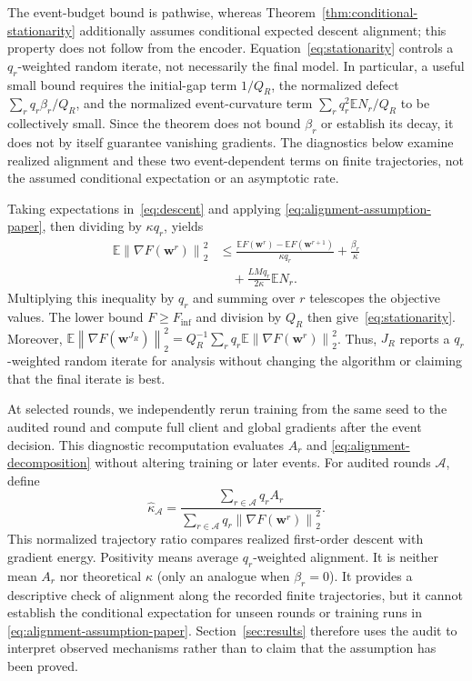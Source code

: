 \documentclass[conference]{IEEEtran}
\newcommand{\E}{\mathbb{E}}
\newcommand{\norm}[1]{\left\lVert#1\right\rVert}
\newcommand{\vect}[1]{\boldsymbol{#1}}
\newcommand{\rev}[1]{#1}
\newcommand{\reviewrev}[1]{#1}
\begin{document}
\reviewrev{The event-budget bound is pathwise, whereas
Theorem~\ref{thm:conditional-stationarity} additionally assumes conditional
expected descent alignment; this property does not follow from the encoder.
Equation~\eqref{eq:stationarity} controls a $q_r$-weighted random iterate,
not necessarily the final model. In particular, a useful small bound requires
the initial-gap term $1/Q_R$, the normalized defect
$\sum_r q_r\beta_r/Q_R$, and the normalized event-curvature term
$\sum_r q_r^2\E N_r/Q_R$ to be collectively small.
Since the theorem does not bound $\beta_r$ or establish its decay,
it does not by itself guarantee vanishing gradients.
The diagnostics below examine realized alignment and these two
event-dependent terms on finite trajectories, not the assumed
conditional expectation or an asymptotic rate.}

\rev{Taking expectations in~\eqref{eq:descent} and applying
\eqref{eq:alignment-assumption-paper}, then dividing by $\kappa q_r$, yields}
\vspace{-3pt}
\begin{align*}
 \E\norm{\nabla F(\vect{w}^r)}_2^2
 &\leq \frac{\E F(\vect{w}^r)-\E F(\vect{w}^{r+1})}
 {\kappa q_r}+\frac{\beta_r}{\kappa}\\
 &\quad+\frac{LMq_r}{2\kappa}\E N_r.
\end{align*}
\rev{Multiplying this inequality by $q_r$ and summing over $r$ telescopes the
objective values. The lower bound $F\geq F_{\inf}$ and division by $Q_R$ then
give~\eqref{eq:stationarity}. Moreover,
$\E\norm{\nabla F(\vect{w}^{J_R})}_2^2=Q_R^{-1}\sum_rq_r
\E\norm{\nabla F(\vect{w}^r)}_2^2$. Thus, $J_R$ reports a
$q_r$-weighted random iterate for analysis without changing the algorithm or
claiming that the final iterate is best.}

At selected rounds, we \rev{independently rerun training from the same seed to
the audited round} and compute full client and global gradients after the event
decision. \rev{This diagnostic recomputation} evaluates $A_r$ and
\eqref{eq:alignment-decomposition} without altering training or later events.
For audited rounds $\mathcal A$, define
\begin{equation}
 \widehat\kappa_{\mathcal A}=
 \frac{\sum_{r\in\mathcal A}q_rA_r}
 {\sum_{r\in\mathcal A}q_r\norm{\nabla F(\vect{w}^r)}_2^2}.
 \label{eq:empirical-alignment-ratio}
\end{equation}
This normalized trajectory ratio compares realized first-order descent with
gradient energy. Positivity means average $q_r$-weighted alignment. It is
neither mean $A_r$ nor theoretical
$\kappa$ (only an analogue when $\beta_r=0$). \rev{It provides a descriptive
check of alignment along the recorded finite trajectories, but it cannot
establish the conditional expectation for unseen rounds or training runs in
\eqref{eq:alignment-assumption-paper}. Section~\ref{sec:results} therefore uses
the audit to interpret observed mechanisms rather than to claim that the
assumption has been proved.}
\end{document}
